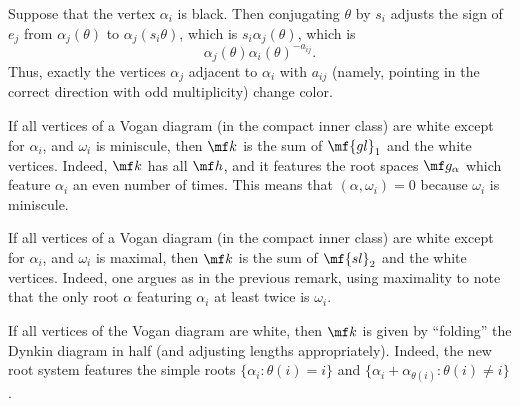 \documentclass{article}
\begin{document}
\begin{remark}
	Suppose that the vertex $\alpha_i$ is black. Then conjugating $\theta$ by $s_i$ adjusts the sign of $e_j$ from $\alpha_j(\theta)$ to $\alpha_j(s_i\theta)$, which is $s_i\alpha_j(\theta)$, which is
	\[\alpha_j(\theta)\alpha_i(\theta)^{-a_{ij}}.\]
	Thus, exactly the vertices $\alpha_j$ adjacent to $\alpha_i$ with $a_{ij}$ (namely, pointing in the correct direction with odd multiplicity) change color.
\end{remark}
\begin{remark}
	If all vertices of a Vogan diagram (in the compact inner class) are white except for $\alpha_i$, and $\omega_i$ is miniscule, then $\mf k$ is the sum of $\mf{gl}_1$ and the white vertices. Indeed, $\mf k$ has all $\mf h$, and it features the root spaces $\mf g_\alpha$ which feature $\alpha_i$ an even number of times. This means that $(\alpha,\omega_i)=0$ because $\omega_i$ is miniscule.
\end{remark}
\begin{remark}
	If all vertices of a Vogan diagram (in the compact inner class) are white except for $\alpha_i$, and $\omega_i$ is maximal, then $\mf k$ is the sum of $\mf{sl}_{2}$ and the white vertices. Indeed, one argues as in the previous remark, using maximality to note that the only root $\alpha$ featuring $\alpha_i$ at least twice is $\omega_i$.
\end{remark}
\begin{remark}
	If all vertices of the Vogan diagram are white, then $\mf k$ is given by ``folding'' the Dynkin diagram in half (and adjusting lengths appropriately). Indeed, the new root system features the simple roots $\{\alpha_i:\theta(i)=i\}$ and $\{\alpha_i+\alpha_{\theta(i)}:\theta(i)\ne i\}$.
\end{remark}
\end{document}
